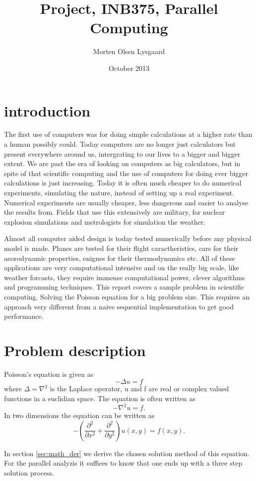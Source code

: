 \documentclass{article}
\title{Project, INB375, Parallel Computing}
\author{Morten Olsen Lysgaard}
\date{October 2013}
\begin{document}
\maketitle

\section{introduction}
The first use of computers was for doing simple calculations at a higher rate
than a human possibly could. Today computers are no longer just calculators but
present everywhere around us, intergrating to our lives to a bigger and bigger extent.
We are past the era of looking on computers as big calculators, but in spite of that
scientific computing and the use of computers for doing ever bigger calculations is just increasing.
Today it is often much cheaper to do numerical experiments, simulating the nature, instead of
setting up a real experiment. Numerical experiments are usually cheaper, less
dangerous and easier to analyse the results from. Fields that use this extensively
are military, for nuclear explosion simulations and metrologists for simulation the weather.

Almost all computer aided design is today tested numerically before any physical model is made.
Planes are tested for their flight caractheristics, cars for their aeorodynamic properties, enignes
for their thermodynamics etc. All of these applications are very computational intensive and on the
really big scale, like weather forcasts, they require immense computational power, clever algorithms
and programming techniques. This report covers a sample problem in scientific computing. Solving the
Poisson equation for a big problem size. This requires an approach very different from a naive
sequential implementation to get good performance.

\section{Problem description}
\label{sec:sol_steps}
Poisson's equation is given as
\[
-\Delta u = f
\]
where $\Delta = \nabla^2$ is the Laplace operator, u and f are real or complex valued functions in a
euclidian space. The equation is often written as
\[
-\nabla^2 u = f.
\]
In two dimensions the equation can be written as
\[
-\left( \frac{\partial^2}{\partial x^2} + \frac{\partial^2}{\partial y^2} \right) u(x,y) = f(x,y).
\]

In section \ref{sec:math_der} we derive the chosen solution method of this equation. 
For the parallel analyzis it suffices to know that one ends up with a three step solution
process.
\end{document}
